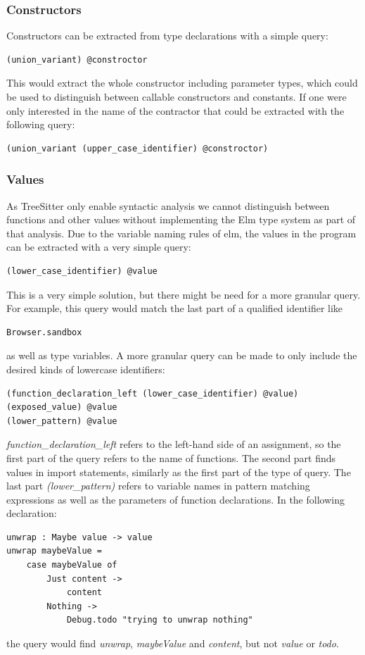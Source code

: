 \documentclass[../thesis.tex]{subfiles}
\begin{document}
\subsubsection{Constructors}
Constructors can be extracted from type declarations with a simple query:
\begin{verbatim}
(union_variant) @constroctor
\end{verbatim}
This would extract the whole constructor including parameter types, which could be used to distinguish
between callable constructors and constants.
If one were only interested in the name of the contractor that could be extracted with the following query:
\begin{verbatim}
(union_variant (upper_case_identifier) @constroctor)
\end{verbatim}

\subsubsection{Values}
As TreeSitter only enable syntactic analysis we cannot distinguish between functions and other values
without implementing the Elm type system as part of that analysis.
Due to the variable naming rules of elm, the values in the program can be extracted with a very simple query:
\begin{verbatim}
(lower_case_identifier) @value
\end{verbatim}
This is a very simple solution, but there might be need for a more granular query.
For example, this query would match the last part of a qualified identifier like
\begin{verbatim}
Browser.sandbox
\end{verbatim}
as well as type variables.
A more granular query can be made to only include the desired kinds of lowercase identifiers:
\begin{verbatim}
(function_declaration_left (lower_case_identifier) @value)
(exposed_value) @value
(lower_pattern) @value
\end{verbatim}
\textit{function\_declaration\_left} refers to the left-hand side of an assignment, so the first part of the query refers to the name of functions.
The second part finds values in import statements, similarly as the first part of the type of query.
The last part \textit{(lower\_pattern)} refers to variable names in pattern matching expressions as well as the parameters of function declarations.
In the following declaration:
\begin{verbatim}
unwrap : Maybe value -> value
unwrap maybeValue =
    case maybeValue of
        Just content ->
            content
        Nothing ->
            Debug.todo "trying to unwrap nothing"
\end{verbatim}
the query would find \textit{unwrap}, \textit{maybeValue} and \textit{content}, but not \textit{value} or \textit{todo}.
\end{document}
